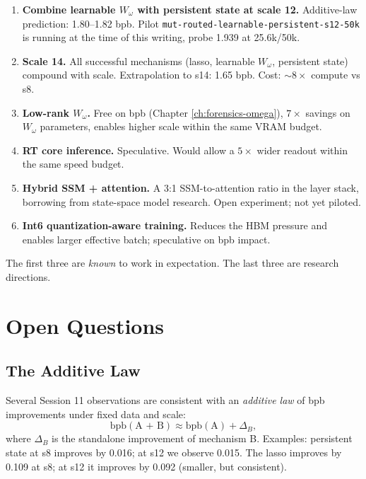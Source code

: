 \documentclass[11pt,openany]{book}
\theoremstyle{definition}
\theoremstyle{plain}
\newcommand{\bpb}{\text{bpb}}
\newcommand{\omegaproj}{W_\omega}
\begin{document}
\begin{enumerate}
  \item \textbf{Combine learnable $\omegaproj$ with persistent state at
    scale 12.} Additive-law prediction: 1.80--1.82 bpb. Pilot
    \texttt{mut-routed-learnable-persistent-s12-50k} is running at the
    time of this writing, probe 1.939 at 25.6k/50k.
  \item \textbf{Scale 14.} All successful mechanisms (lasso,
    learnable $\omegaproj$, persistent state) compound with scale.
    Extrapolation to s14: 1.65 bpb. Cost: $\sim 8\times$ compute vs s8.
  \item \textbf{Low-rank $\omegaproj$.} Free on bpb (Chapter
    \ref{ch:forensics-omega}), $7\times$ savings on
    $\omegaproj$ parameters, enables higher scale within the same
    VRAM budget.
  \item \textbf{RT core inference.} Speculative. Would allow a
    $5\times$ wider readout within the same speed budget.
  \item \textbf{Hybrid SSM + attention.} A 3:1 SSM-to-attention ratio
    in the layer stack, borrowing from state-space model research.
    Open experiment; not yet piloted.
  \item \textbf{Int6 quantization-aware training.} Reduces the HBM
    pressure and enables larger effective batch; speculative on bpb
    impact.
\end{enumerate}

The first three are \emph{known} to work in expectation. The last three
are research directions.

\part{Open Questions}

\chapter{The Additive Law}

Several Session 11 observations are consistent with an \emph{additive law}
of bpb improvements under fixed data and scale:
\begin{equation}
  \bpb(\text{A + B}) \approx \bpb(\text{A}) + \Delta_B,
\end{equation}
where $\Delta_B$ is the standalone improvement of mechanism B. Examples:
persistent state at s8 improves by 0.016; at s12 we observe 0.015. The
lasso improves by 0.109 at s8; at s12 it improves by 0.092 (smaller, but
consistent).
\end{document}
